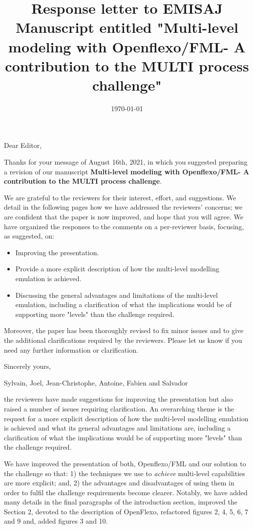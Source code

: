\documentclass[10pt]{article}
\title{Response letter to EMISAJ Manuscript entitled "Multi-level modeling with Openflexo/FML- A contribution to the MULTI process challenge"}
\date{\today}
\begin{document}
Dear Editor,

\bigskip
Thanks for your message of August 16th, 2021, in which you suggested preparing a revision of our manuscript  \textbf{Multi-level modeling with Openflexo/FML- A contribution to the MULTI process challenge}. 

\bigskip
We are grateful to the reviewers for their interest, effort, and suggestions. We detail in the following pages how we have addressed the reviewers' concerns; we are confident that the paper is now improved, and hope that you will agree. We have organized the responses to the comments on a per-reviewer basis, focusing, as suggested, on: 

\begin{itemize}
\item Improving the presentation.
\item Provide a more explicit description of how the multi-level modelling emulation is achieved.
\item Discussing the general advantages and limitations of the multi-level emulation, including a clarification of what the implications would be of supporting more "levels" than the challenge required.
\end{itemize}

Moreover, the paper has been thoroughly revised to fix minor issues and to give the additional clarifications required by the reviewers. Please let us know if you need any further information or clarification.

\bigskip
Sincerely yours,

\bigskip
Sylvain, Joel, Jean-Christophe, Antoine, Fabien and Salvador

\pagebreak

\Editor{}

\begin{response}{the reviewers have made suggestions for improving the presentation but also raised a number of issues requiring clarification. An overarching theme is the request for a more explicit description of how the multi-level modelling emulation is achieved and what its general advantages and limitations are, including a clarification of what the implications would be of supporting more "levels" than the challenge required.}

We have improved the presentation of both, Openflexo/FML and our solution to the challenge so that: 1) the techniques we use to \emph{achieve} multi-level capabilities are more explicit; and, 2) the advantages and disadvantages of using them in order to fulfil the challenge requirements become clearer. Notably, we have added many details in the final paragraphs of the introduction section, improved the Section 2, devoted to the description of OpenFlexo, refactored figures 2, 4, 5, 6, 7 and 9 and, added figures 3 and 10.
\end{response}
\end{document}
